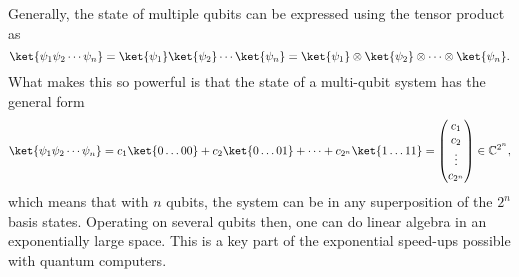 Generally, the state of multiple qubits can be expressed using the tensor product as
\begin{equation}
    \ket{\psi_1 \psi_2 \cdots  \psi_n}
    = \ket{\psi_1} \ket{\psi_2} \cdots \ket{\psi_n}
    = \ket{\psi_1} \otimes \ket{\psi_2} \otimes \cdots \otimes \ket{\psi_n}
    \label{eq:tensor}.
\end{equation}
What makes this so powerful is that the state of a multi-qubit system has the general form
\begin{equation}
    \ket{\psi_1 \psi_2 \cdots  \psi_n}
    = c_1 \ket{0\dots 00} + c_2 \ket{0\dots 01} + \cdots + c_{2^n} \ket{1\dots 11}
    = \begin{pmatrix}
        c_1 \\ c_2 \\ \vdots \\ c_{2^n}
    \end{pmatrix}
    \in \mathbb{C}^{2^n},
    \label{eq:superposition}
\end{equation}
which means that with $n$ qubits, the system can be in any superposition of the $2^n$ basis states.
Operating on several qubits then, one can do linear algebra in an exponentially large space.
This is a key part of the exponential speed-ups possible with quantum computers.